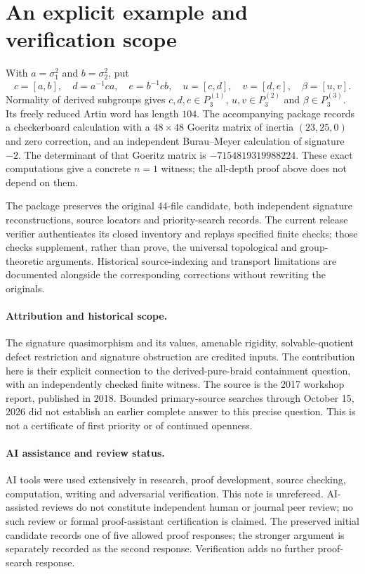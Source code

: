 \documentclass[11pt]{article}
\begin{document}
\section{An explicit example and verification scope}\label{sec:explicit}
With $a=\sigma_1^2$ and $b=\sigma_2^2$, put
\[
 c=[a,b],\quad d=a^{-1}ca,\quad e=b^{-1}cb,\quad
 u=[c,d],\quad v=[d,e],\quad \beta=[u,v].
\]
Normality of derived subgroups gives $c,d,e\in P_3^{(1)}$,
$u,v\in P_3^{(2)}$ and $\beta\in P_3^{(3)}$.
Its freely reduced Artin word has length $104$.
The accompanying package records a checkerboard calculation with a
$48\times48$ Goeritz matrix of inertia $(23,25,0)$ and zero correction,
and an independent Burau--Meyer calculation of signature $-2$.
The determinant of that Goeritz matrix is $-7154819319988224$.
These exact computations give a concrete $n=1$ witness; the all-depth
proof above does not depend on them.

The package preserves the original 44-file candidate, both independent
signature reconstructions, source locators and priority-search records.
The current release verifier authenticates its closed inventory and
replays specified finite checks; those checks supplement, rather than
prove, the universal topological and group-theoretic arguments.
Historical source-indexing and transport limitations are documented
alongside the corresponding corrections without rewriting the originals.

\paragraph{Attribution and historical scope.}
The signature quasimorphism and its values, amenable rigidity,
solvable-quotient defect restriction and signature obstruction are credited
inputs. The contribution here is their explicit connection to the
derived-pure-braid containment question, with an independently checked
finite witness. The source is the 2017 workshop report, published in
2018. Bounded primary-source searches through October 15, 2026 did not
establish an earlier complete answer to this precise question. This is
not a certificate of first priority or of continued openness.

\paragraph{AI assistance and review status.}
AI tools were used extensively in research, proof development, source
checking, computation, writing and adversarial verification. This note is
unrefereed. AI-assisted reviews do not constitute independent human or
journal peer review; no such review or formal proof-assistant
certification is claimed. The preserved initial candidate records one of five allowed proof
responses; the stronger argument is separately recorded as the second
response. Verification adds no further proof-search response.
\end{document}
